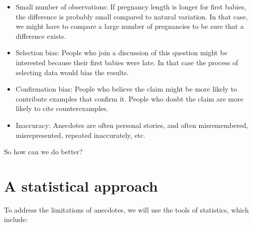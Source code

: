 \documentclass[12pt]{book}
\begin{document}
\begin{itemize}

\item Small number of observations: If pregnancy length is longer
  for first babies, the difference is probably small compared to
  natural variation.  In that case, we might have to compare a large
  number of pregnancies to be sure that a difference exists.

\item Selection bias: People who join a discussion of this question
  might be interested because their first babies were late.  In that
  case the process of selecting data would bias the results.

\item Confirmation bias:  People who believe the claim might be more
  likely to contribute examples that confirm it.  People who doubt the
  claim are more likely to cite counterexamples.

\item Inaccuracy: Anecdotes are often personal stories, and often
  misremembered, misrepresented, repeated
  inaccurately, etc.

\end{itemize}

So how can we do better?


\section{A statistical approach}

To address the limitations of anecdotes, we will use the tools
of statistics, which include:
\end{document}
